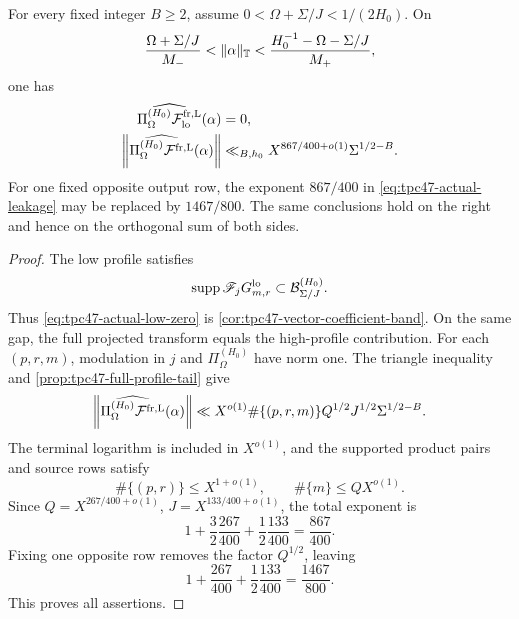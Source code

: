 \begin{theorem}
\label{thm:tpc47-actual-transfer}
For every fixed integer \(B\ge2\), assume
\(0<\Omega+\Sigma/J<1/(2H_0)\).  On
\begin{equation}
 \frac{\Omega+\Sigma/J}{M_-}
 <\|\alpha\|_{\mathbb T}<
 \frac{H_0^{-1}-\Omega-\Sigma/J}{M_+},
 \label{eq:tpc47-actual-gap}
\end{equation}
one has
\begin{align}
 \widehat{\Pi_{\Omega}^{(H_0)}
 \mathcal F_{\rm lo}^{\rm fr,L}}(\alpha)&=0,
 \label{eq:tpc47-actual-low-zero}\\
 \left\|
 \widehat{\Pi_{\Omega}^{(H_0)}
 \mathcal F^{\rm fr,L}}(\alpha)
 \right\|
 &\ll_{B,h_0}
 X^{867/400+o(1)}\Sigma^{1/2-B}.
 \label{eq:tpc47-actual-leakage}
\end{align}
For one fixed opposite output row, the exponent \(867/400\) in
\eqref{eq:tpc47-actual-leakage} may be replaced by \(1467/800\).
The same conclusions hold on the right and hence on the orthogonal
sum of both sides.
\end{theorem}

\begin{proof}
The low profile satisfies
\[
 \operatorname{supp}\mathscr F_jG_{m,r}^{\rm lo}
 \subset\mathcal B_{\Sigma/J}^{(H_0)}.
\]
Thus \eqref{eq:tpc47-actual-low-zero} is
\cref{cor:tpc47-vector-coefficient-band}.  On the same gap, the full
projected transform equals the high-profile contribution.  For each
\((p,r,m)\), modulation in \(j\) and
\(\Pi_{\Omega}^{(H_0)}\) have norm one.  The triangle inequality and
\cref{prop:tpc47-full-profile-tail} give
\begin{equation}
 \left\|
 \widehat{\Pi_{\Omega}^{(H_0)}
 \mathcal F^{\rm fr,L}}(\alpha)
 \right\|
 \ll X^{o(1)}\#\{(p,r,m)\}
 Q^{1/2}J^{1/2}\Sigma^{1/2-B}.
 \label{eq:tpc47-crude-support-bound}
\end{equation}
The terminal logarithm is included in \(X^{o(1)}\), and the supported
product pairs and source rows satisfy
\begin{equation}
 \#\{(p,r)\}\le X^{1+o(1)},
 \qquad
 \#\{m\}\le QX^{o(1)}.
 \label{eq:tpc47-tuple-counts}
\end{equation}
Since \(Q=X^{267/400+o(1)}\),
\(J=X^{133/400+o(1)}\), the total exponent is
\begin{equation}
 1+\frac32\frac{267}{400}
 +\frac12\frac{133}{400}
 =\frac{867}{400}.
 \label{eq:tpc47-full-prefactor-ledger}
\end{equation}
Fixing one opposite row removes the factor \(Q^{1/2}\), leaving
\begin{equation}
 1+\frac{267}{400}
 +\frac12\frac{133}{400}
 =\frac{1467}{800}.
 \label{eq:tpc47-fixed-row-prefactor-ledger}
\end{equation}
This proves all assertions.
\end{proof}

